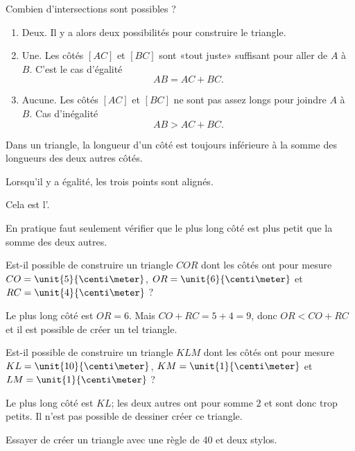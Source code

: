Combien d'intersections sont possibles ?
\begin{enumerate}
    \item
        Deux. Il y a alors deux possibilités pour construire le triangle.
    \item
        Une. Les côtés \( [AC]\) et \( [BC]\) sont «tout juste» suffisant pour aller de \( A\) à \( B\). C'est le cas d'égalité
        \begin{equation}
            AB=AC+BC.
        \end{equation}
    \item 
        Aucune. Les côtés \( [AC]\) et \( [BC]\) ne sont pas assez longs pour joindre \( A\) à \( B\). Cas d'inégalité
        \begin{equation}
            AB>AC+BC.
        \end{equation}
\end{enumerate}

\begin{Aretenir}
Dans un triangle, la longueur d'un côté est toujours inférieure à la somme des longueurs des deux autres côtés.

Lorsqu'il y a égalité, les trois points sont alignés.

Cela est l'.
\end{Aretenir}

En pratique faut seulement vérifier que le plus long côté est plus petit que la somme des deux autres.

\begin{example}
    Est-il possible de construire un triangle \( COR\) dont les côtés ont pour mesure \( CO=\unit{5}{\centi\meter}\), \( OR=\unit{6}{\centi\meter}\) et \( RC=\unit{4}{\centi\meter}\) ?

    Le plus long côté est \( OR=6\). Mais \( CO+RC=5+4=9\), donc \( OR<CO+RC\) et il est possible de créer un tel triangle.
\end{example}

\begin{example}
    Est-il possible de construire un triangle \( KLM\) dont les côtés ont pour mesure \( KL=\unit{10}{\centi\meter}\), \( KM=\unit{1}{\centi\meter}\) et \( LM=\unit{1}{\centi\meter}\) ?

    Le plus long côté est \( KL\); les deux autres ont pour somme \( 2\) et sont donc trop petits. Il n'est pas possible de dessiner créer ce triangle.

\begin{center}
   
\end{center}

\end{example}

\begin{example}
    Essayer de créer un triangle avec une règle de \unit{40}{\centi\meter} et deux stylos.
\end{example}
